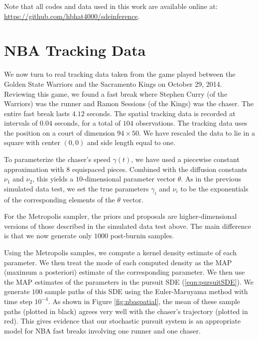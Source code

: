 \documentclass[graybox]{svmult}
\begin{document}
Note that all codes and data used in this work are available online at:\\
\url{https://github.com/hbhat4000/sdeinference}.

\section{NBA Tracking Data}
We now turn to real tracking data taken from the game played between
the Golden State Warriors and the Sacramento Kings on October 29,
2014.  Reviewing this game, we found a fast break where Stephen Curry
(of the Warriors) was the runner and Ramon Sessions (of the Kings) was
the chaser.  The entire fast break lasts $4.12$ seconds.  The spatial
tracking data is recorded at intervals of $0.04$ seconds, for a total
of $104$ observations.  The tracking data uses the position on a court
of dimension $94 \times 50$.  We have rescaled the data to lie in a
square with center $(0,0)$ and side length equal to one.

To parameterize the chaser's speed $\gamma(t)$, we have used a
piecewise constant approximation with $8$ equispaced pieces.  Combined
with the diffusion constants $\nu_1$ and $\nu_2$, this yields a
$10$-dimensional parameter vector $\theta$.  As in the previous
simulated data test, we set the true parameters $\gamma_i$ and $\nu_i$ to
be the exponentials of the corresponding elements of the $\theta$
vector.

For the Metropolis sampler, the priors and proposals are
higher-dimensional versions of those described in the simulated data
test above.  The main difference is that we now generate only $1000$
post-burnin samples. 

Using the Metropolis samples, we compute a kernel density estimate of
each parameter.  We then treat the mode of each computed density as
the MAP (maximum a posteriori) estimate of the corresponding
parameter.  We then use the MAP estimates of the parameters in the
pursuit SDE (\ref{eqn:pursuitSDE}).  We generate $100$ sample paths of
this SDE using the Euler-Maruyama method with time step $10^{-4}$.  As
shown in Figure \ref{fig:nbaspatial}, the mean of these sample paths
(plotted in black) agrees very well with the chaser's trajectory
(plotted in red).  This gives evidence that our stochastic pursuit
system is an appropriate model for NBA fast breaks involving one
runner and one chaser.
\end{document}
